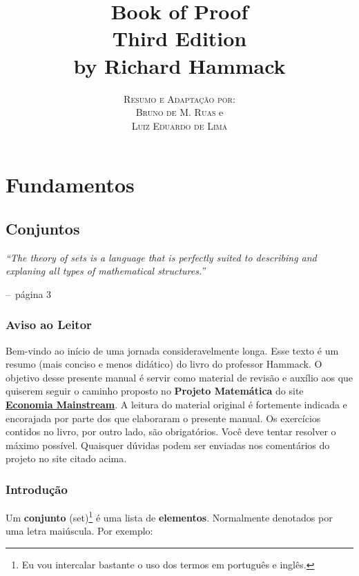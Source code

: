 \documentclass[a4paper,11pt]{book}
\title{\Huge \textbf{Book of Proof} \\ 
\Large Third Edition \\
\huge by Richard Hammack}
\author{
\textsc{Resumo e Adaptação por:} \\
\textsc{Bruno de M. Ruas} e \\ 
\textsc{Luiz Eduardo de Lima} 
}
\makeatletter
\theoremstyle{definition}
\theoremstyle{break}
\newenvironment{chapquote}[2][2em]
  {\setlength{\@tempdima}{#1}%
   \def\chapquote@author{#2}%
   \parshape 1 \@tempdima \dimexpr\textwidth-2\@tempdima\relax%
   \itshape}
  {\par\normalfont\hfill--\ \chapquote@author\hspace*{\@tempdima}\par\bigskip}
\makeatother
\begin{document}
\frontmatter
\maketitle

\tableofcontents

\mainmatter

\part{Fundamentos}

\chapter{Conjuntos}

\begin{chapquote}{página 3}
	``The theory of sets is a language that is perfectly suited to describing and explaning all types of mathematical structures.''
\end{chapquote}

\section*{Aviso ao Leitor}
Bem-vindo ao início de uma jornada consideravelmente longa. Esse texto é um resumo (mais conciso e menos didático) do livro do professor Hammack. O objetivo desse presente manual é servir como material de revisão e auxílio aos que quiserem seguir o caminho proposto no \textbf{Projeto Matemática} do site \href{https://economiamainstream.com.br/artigo/matematica/}{\textbf{Economia Mainstream}}. A leitura do material original é fortemente indicada e encorajada por parte dos que elaboraram o presente manual. Os exercícios contidos no livro, por outro lado, são obrigatórios. Você deve tentar resolver o máximo possível. Quaisquer dúvidas podem ser enviadas nos comentários do projeto no site citado acima.


\section{Introdução}
Um \textbf{conjunto} (set)\footnote{Eu vou intercalar bastante o uso dos termos em português e inglês.} é uma lista de \textbf{elementos}. Normalmente denotados por uma letra maiúscula. Por exemplo:
\end{document}
